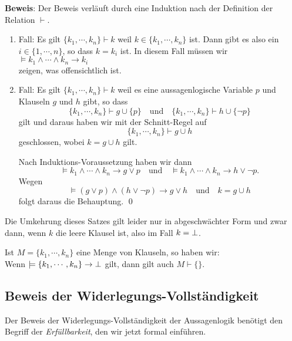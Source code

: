 \noindent
\textbf{Beweis}:  Der Beweis verl\"{a}uft durch eine Induktion nach der Definition der Relation $\vdash$. 
\begin{enumerate}
\item Fall: Es gilt $\{ k_1, \cdots, k_n \} \vdash k$ weil $k \in \{ k_1, \cdots, k_n \}$ ist.  
      Dann gibt es also ein $i \in \{1,\cdots,n\}$, so dass $k = k_i$ ist.  In diesem Fall
      m\"{u}ssen wir
      \\[0.2cm]
      \hspace*{1.3cm}
      $\models k_1 \wedge \cdots \wedge k_n \rightarrow k_i$
      \\[0.2cm]
      zeigen, was offensichtlich ist.
\item Fall: Es gilt $\{ k_1, \cdots, k_n \} \vdash k$ weil es eine aussagenlogische
      Variable $p$ und Klauseln $g$ und $h$ gibt, so dass 
      \[ \{ k_1, \cdots, k_n \} \vdash g \cup \{ p \} \quad \mathrm{und} \quad
         \{ k_1, \cdots, k_n \} \vdash h \cup \{ \neg p \}
      \]
      gilt und daraus haben wir mit der Schnitt-Regel auf
      \[ \{ k_1, \cdots, k_n \} \vdash g \cup h \]
      geschlossen, wobei $k = g \cup h$ gilt. 

      Nach Induktions-Voraussetzung haben wir dann
      \[ \models k_1 \wedge \cdots \wedge k_n \rightarrow g \vee p \quad \mathrm{und} \quad 
         \models k_1 \wedge \cdots \wedge k_n \rightarrow h \vee \neg p. \]
      Wegen 
      \[ \models (g \vee p) \wedge (h \vee \neg p) \rightarrow g \vee h \quad \mathrm{und} \quad
         k = g \cup h \]
      folgt daraus die Behauptung.
      \qed
\end{enumerate}

\noindent
Die Umkehrung dieses Satzes gilt leider nur in abgeschw\"{a}chter Form und zwar dann, wenn $k$
die leere Klausel ist, also im Fall $k = \bot$.
\begin{Satz} \label{widerlegungs-vollstaendig}
  Ist  $M = \{k_1, \cdots, k_n \}$ eine Menge von Klauseln,
  so haben wir: \\[0.1cm]
  \hspace*{1.3cm} 
  Wenn $\models \{ k_1, \cdots, k_n \} \rightarrow \bot$ gilt, dann gilt auch  $M \vdash \{\}$.
\end{Satz}
\vspace*{0.2cm}



\subsection{Beweis der Widerlegungs-Vollst\"{a}ndigkeit}
Der Beweis der Widerlegungs-Vollst\"{a}ndigkeit der Aussagenlogik ben\"{o}tigt den  Begriff der
\emph{Erf\"{u}llbarkeit}, den wir jetzt formal einf\"{u}hren. 

